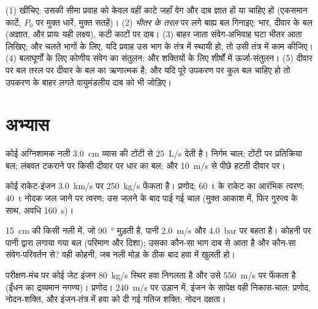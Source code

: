 \begin{method}[कोई संतुलन खड़ा करना]\label{met:b2:flow-balances:method}
(1)  खींचिए: उसकी सीमा प्रवाह को केवल वहीं काटे जहाँ वेग और
दाब ज्ञात हों या चाहिए हों (एकसमान काटें,
$P_0$ पर मुक्त धारें, मुक्त सतहें)। (2) \emph{भीतर के तरल} पर लगे बाह्य बल
गिनाइए: भार, दीवार के बल (अज्ञात, और प्रायः यही लक्ष्य),
कटी काटों पर दाब। (3) बाहर जाता संवेग-अभिवाह घटा भीतर आता लिखिए;
और चलते भागों के लिए, यदि प्रवाह उस भाग के तंत्र में स्थायी हो, तो
उसी तंत्र में काम कीजिए। (4) बलाघूर्णों के लिए कोणीय संवेग का संतुलन; और
शक्तियों के लिए शीर्षों में ऊर्जा-संतुलन। (5) दीवार पर बल
तरल पर दीवार के बल का ऋणात्मक है; और यदि पूरे उपकरण पर कुल बल चाहिए
हो तो उपकरण के बाहर लगते वायुमंडलीय दाब को भी जोड़िए।
\end{method}

\section{अभ्यास}

\begin{exercise}[$\star$]\label{exo:b2:flow-balances:1}
कोई अग्निशामक नली \qty{3.0}{cm} व्यास की टोंटी से \qty{25}{L/s}
देती है। निर्गम चाल; टोंटी पर प्रतिक्रिया बल; लंबवत टकराने पर किसी
दीवार पर धार का बल; और \qty{10}{m/s} से पीछे हटती दीवार पर।
\end{exercise}

\begin{exercise}[$\star$]\label{exo:b2:flow-balances:2}
कोई राकेट-इंजन \qty{3.0}{km/s} पर \qty{250}{kg/s} फेंकता है। प्रणोद; \qty{60}{t}
के राकेट का आरंभिक त्वरण; \qty{40}{t} नोदक जल जाने पर
त्वरण; उस जलने के बाद पाई गई चाल (मुक्त आकाश में, फिर
गुरुत्व के साथ, अवधि \qty{160}{s})।
\end{exercise}

\begin{exercise}[$\star$]\label{exo:b2:flow-balances:3}
\qty{15}{cm} की किसी नली में, जो \qty{90}{\degree} मुड़ती है, पानी
\qty{2.0}{m/s} और \qty{4.0}{bar} पर बहता है। कोहनी पर पानी द्वारा लगाया गया बल
(परिमाण और दिशा); उसका कौन-सा भाग दाब से आता है और कौन-सा
संवेग-परिवर्तन से? वही कोहनी, जब नली मोड़ के ठीक बाद हवा में खुलती हो।
\end{exercise}

\begin{exercise}[$\star$]\label{exo:b2:flow-balances:4}
परीक्षण-मंच पर कोई जेट इंजन \qty{80}{kg/s} स्थिर हवा निगलता है और उसे
\qty{550}{m/s} पर फेंकता है (ईंधन का द्रव्यमान नगण्य)। प्रणोद। \qty{240}{m/s} पर
उड़ान में, इंजन के सापेक्ष वही निकास-चाल: प्रणोद,
नोदन-शक्ति, और इंजन-तंत्र में हवा को दी गई गतिज शक्ति;
नोदन दक्षता।
\end{exercise}

